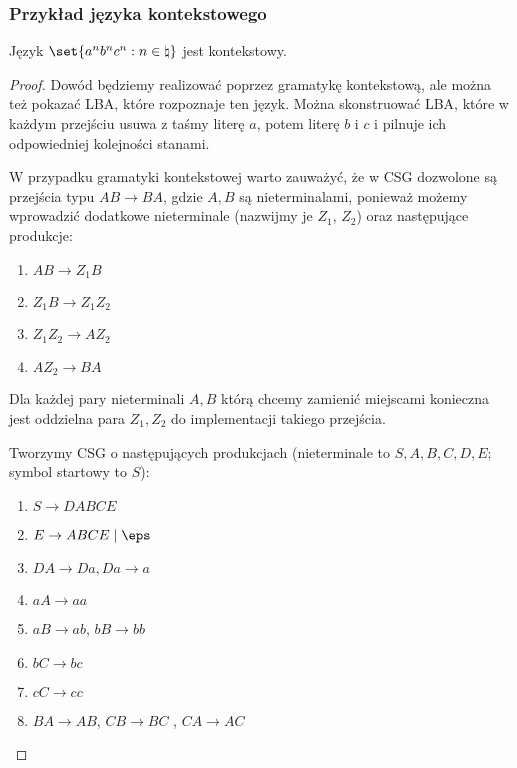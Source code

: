 \subsubsection{Przykład języka kontekstowego}
\label{csl_example}
\begin{theorem}
    Język \( \set{a^nb^nc^n : n \in \natural} \) jest kontekstowy.
\end{theorem}
\begin{proof}
    Dowód będziemy realizować poprzez gramatykę kontekstową, ale można też pokazać LBA, które rozpoznaje ten język. Można skonstruować LBA, które w każdym przejściu usuwa z taśmy literę \(a\), potem literę \(b\) i \(c\) i pilnuje ich odpowiedniej kolejności stanami. 

    W przypadku gramatyki kontekstowej warto zauważyć, że w CSG dozwolone są przejścia typu \(AB \rightarrow BA\), gdzie \(A, B\) są nieterminalami, ponieważ możemy wprowadzić dodatkowe nieterminale (nazwijmy je \(Z_1\), \(Z_2\)) oraz następujące produkcje:
    \begin{enumerate}
        \item \(AB \rightarrow Z_1B\)
        \item \(Z_1B \rightarrow Z_1Z_2 \) 
        \item \( Z_1Z_2 \rightarrow AZ_2 \)
        \item \( AZ_2 \rightarrow BA \)        
    \end{enumerate}
    Dla każdej pary nieterminali \(A, B\) którą chcemy zamienić miejscami konieczna jest oddzielna para \(Z_1, Z_2\) do implementacji takiego przejścia. 

    Tworzymy CSG o następujących produkcjach (nieterminale to \(S, A, B, C, D, E\); symbol startowy to \(S\)):    
    \begin{enumerate}
        \item \( S \rightarrow DABCE \)
        \item \( E \rightarrow ABCE \mid \eps \) 
        \item \( DA \rightarrow Da, Da \rightarrow a\) 
        \item \( aA \rightarrow aa \)
        \item \( aB  \rightarrow ab \), \( bB \rightarrow bb \)
        \item \( bC \rightarrow bc \)
        \item \( cC \rightarrow cc \)
        \item \( BA \rightarrow AB \), \( CB \rightarrow BC \) , \(CA \rightarrow AC\)
    \end{enumerate}


\end{proof}
